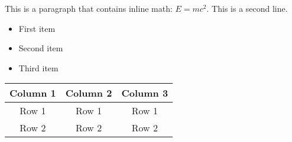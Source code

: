 \documentclass{article}  %
\begin{document}
This is a paragraph that contains inline math: $E=mc^2$.
This is a second line.

\begin{itemize}
    \item First item
    \item Second item
    \item Third item
\end{itemize}

\begin{tabular}{|c|c|c|}
    \hline
    Column 1 & Column 2 & Column 3 \\
    \hline
    Row 1 & Row 1 & Row 1 \\
    \hline
    Row 2 & Row 2 & Row 2 \\
    \hline
\end{tabular}
\end{document}
